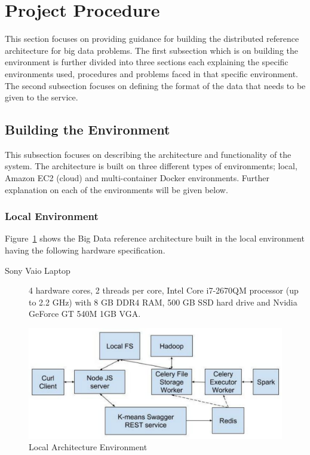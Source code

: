 \section{Project Procedure}

This section focuses on providing guidance for building the distributed 
reference architecture for big data problems. The first subsection which is on 
building the environment is further divided into three sections each 
explaining the specific environments used, procedures and problems faced in 
that specific environment. The second subsection focuses on defining the 
format of the data that needs to be given to the service.   

\subsection{Building the Environment}

This subsection focuses on describing the architecture and functionality of 
the system. The architecture is built on three different types of 
environments; local, Amazon EC2 (cloud) and multi-container Docker 
environments. Further explanation on each of the environments will be given 
below.

\subsubsection{Local Environment}
\label{subsubsec:localenv}

Figure~\ref{fig:localarchitecture} shows the Big Data reference architecture 
built in the local environment having the following hardware specification.

\begin{description}
	\item[Sony Vaio Laptop] 4 hardware cores, 2 threads per core, Intel Core 
	i7-2670QM processor (up to 2.2 GHz) with 8 GB DDR4 RAM, 500 GB SSD hard 
	drive and Nvidia GeForce GT 540M 1GB VGA.
\end{description}

\begin{figure}[htbp] 
	\centering
	\includegraphics[width=\columnwidth]{images/localarchitecture.pdf}
	\caption{Local Architecture Environment}
\label{fig:localarchitecture} 
\end{figure}

